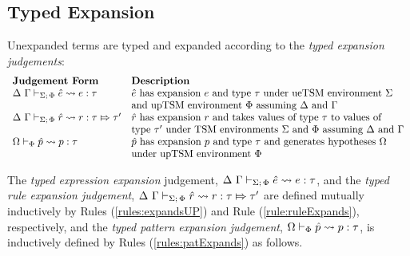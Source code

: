 {{{{\subsection{Typed Expansion}
Unexpanded terms are typed and expanded according to the \emph{typed expansion judgements}:
\[\begin{array}{ll}
\textbf{Judgement Form} & \textbf{Description}\\
\Delta~\Gamma \vdash_{\Sigma;\,\Phi} {\hat e} \leadsto e : \tau & \text{${\hat e}$ has expansion $e$ and type $\tau$ under ueTSM environment $\Sigma$}\\
& \text{and upTSM environment $\Phi$ assuming $\Delta$ and $\Gamma$}\\
\Delta~\Gamma \vdash_{\Sigma;\,\Phi} \hat{r} \leadsto r : \tau \Mapsto \tau' & \text{$\hat{r}$ has expansion $r$ and takes values of type $\tau$ to values of}\\
& \text{type $\tau'$ under TSM environments $\Sigma$ and $\Phi$ assuming $\Delta$ and $\Gamma$}\\
\Omega \vdash_{\Phi} \hat{p} \leadsto p : \tau & \text{$\hat{p}$ has expansion $p$ and type $\tau$ and generates hypotheses $\Omega$ }\\
& \text{under upTSM environment $\Phi$}
\end{array}\]

The \emph{typed expression expansion} judgement, $\Delta~\Gamma \vdash_{\Sigma;\,\Phi} {\hat e} \leadsto e : \tau$, and the \emph{typed rule expansion judgement}, $\Delta~\Gamma \vdash_{\Sigma;\,\Phi} \hat{r} \leadsto r : \tau \Mapsto \tau'$ are defined mutually inductively by Rules (\ref*{rules:expandsUP}) and Rule (\ref*{rule:ruleExpands}), respectively, and the \emph{typed pattern expansion judgement}, $\Omega \vdash_{\Phi} \hat{p} \leadsto p : \tau$, is inductively defined by Rules (\ref*{rules:patExpands}) as follows.

}}}}
